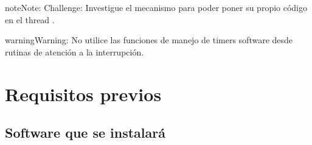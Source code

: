 \documentclass[letterpaper,10pt,english]{sphinxmanual}
\begin{document}
\begin{sphinxadmonition}{note}{Note:}
\sphinxAtStartPar
Challenge: Investigue el mecanismo para poder poner su propio código en el thread .
\end{sphinxadmonition}

\begin{sphinxadmonition}{warning}{Warning:}
\sphinxAtStartPar
No utilice las funciones de manejo de timers software desde rutinas de atención a la interrupción.
\end{sphinxadmonition}

\sphinxstepscope


\chapter{Requisitos previos}
\label{\detokenize{requisitos:requisitos-previos}}\label{\detokenize{requisitos:requisitos}}\label{\detokenize{requisitos::doc}}

\section{Software que se instalará}
\label{\detokenize{requisitos:software-que-se-instalara}}
\end{document}
